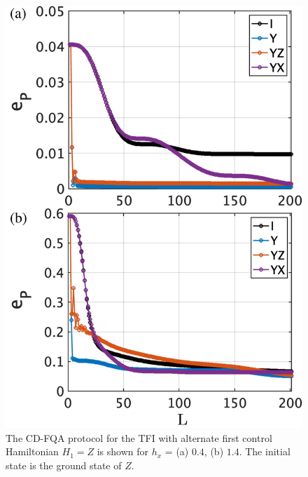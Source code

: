 \documentclass[twocolumn,aps,superscriptaddress,floatfix,longbibliography]{revtex4-2}
\begin{document}
\begin{figure}[h!]
    \centering
    \includegraphics[scale=0.2]{zadd.pdf}
    \caption{The CD-FQA protocol for the TFI with alternate first control Hamiltonian $H_1=Z$ is shown for $h_x$ = (a) $0.4$, (b) $1.4$. The initial state is the ground state of $Z$.}
    \label{fig:TFIwithZ}
\end{figure}
\end{document}
